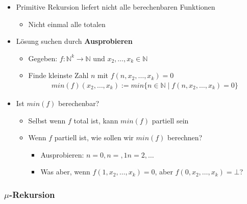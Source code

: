 \documentclass{scrartcl}
\begin{document}
\begin{itemize}
	\item Primitive Rekursion liefert nicht alle berechenbaren Funktionen
	\begin{itemize}
		\item Nicht einmal alle totalen
	\end{itemize}
	\item Lösung suchen durch \textbf{Ausprobieren}
	\begin{itemize}
		\item Gegeben: $f: \mathbb{N}^k \rightarrow \mathbb{N}$ und $x_2,\ldots,x_k \in \mathbb{N}$
		\item Finde kleinste Zahl $n$ mit $f(n,x_2,\ldots,x_k) = 0$
		\begin{align*}
			min(f)(x_2,\ldots,x_k) := min\{ n \in \mathbb{N} \mid f(n,x_2,\ldots,x_k) = 0 \}
		\end{align*}
	\end{itemize}
	\item Ist $min(f)$ berechenbar?
	\begin{itemize}
		\item Selbst wenn $f$ total ist, kann $min(f)$ partiell sein
		\item Wenn $f$ partiell ist, wie sollen wir $min(f)$ berechnen?
		\begin{itemize}
			\item Ausprobieren: $n=0,n=,1n=2,\ldots$
			\item Was aber, wenn $f(1,x_2,\ldots,x_k) = 0$, aber $f(0,x_2,\ldots,x_k) = \bot$?
		\end{itemize}
	\end{itemize}
\end{itemize}

\subsubsection{$\mu$-Rekursion}
\end{document}
